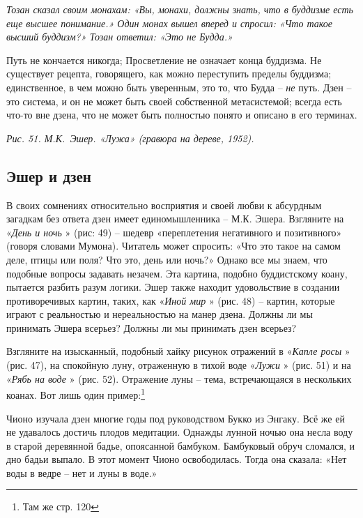 \documentclass[../main.tex]{subfiles}
\begin{document}
\emph{Тозан сказал своим монахам: «Вы, монахи, должны знать, что в буддизме есть еще высшее понимание.» Один монах вышел вперед и спросил: «Что такое высший буддизм?» Тозан ответил: «Это не Будда.»}

Путь не кончается никогда; Просветление не означает конца буддизма. Не существует рецепта, говорящего, как можно переступить пределы буддизма; единственное, в чем можно быть уверенным, это то, что Будда \--- \emph{не} путь. Дзен \--- это система, и он не может быть своей собственной метасистемой; всегда есть что-то вне дзена, что не может быть полностью понято и описано в его терминах.

\emph{Рис. 51. М.К.~Эшер. «Лужа» (гравюра на дереве, 1952).}


\subsection{Эшер и дзен}

В своих сомнениях относительно восприятия и своей любви к абсурдным загадкам без ответа дзен имеет единомышленника \--- М.К. Эшера. Взгляните на «\emph{День и ночь} » (рис: 49) \--- шедевр «переплетения негативного и позитивного» (говоря словами Мумона). Читатель может спросить: «Что это такое на самом деле, птицы или поля? Что это, день или ночь?» Однако все мы знаем, что подобные вопросы задавать незачем. Эта картина, подобно буддистскому коану, пытается разбить разум логики. Эшер также находит удовольствие в создании противоречивых картин, таких, как «\emph{Иной мир} » (рис. 48) \--- картин, которые играют с реальностью и нереальностью на манер дзена. Должны ли мы принимать Эшера всерьез? Должны ли мы принимать дзен всерьез?

Взгляните на изысканный, подобный хайку рисунок отражений в «\emph{Капле росы} » (рис. 47), на спокойную луну, отраженную в тихой воде «\emph{Лужи} » (рис. 51) и на «\emph{Рябь на воде} » (рис. 52). Отражение луны \--- тема, встречающаяся в нескольких коанах. Вот лишь один пример:\footnote{Там же стр. 120}

\begin{koan}
    Чионо изучала дзен многие годы под руководством Букко из Энгаку. Всё же ей не удавалось достичь плодов медитации. Однажды лунной ночью она несла воду в старой деревянной бадье, опоясанной бамбуком. Бамбуковый обруч сломался, и дно бадьи выпало. В этот момент Чионо освободилась. Тогда она сказала: «Нет воды в ведре \--- нет и луны в воде.»
\end{koan}
\end{document}
